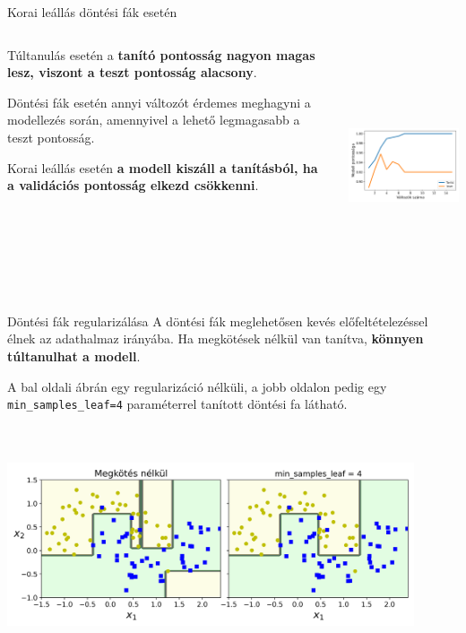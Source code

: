 \documentclass[english, aspectratio=169]{beamer}
\begin{document}
\begin{frame}{Korai leállás döntési fák esetén}
\begin{columns}
\begin{column}{.5\textwidth}
Túltanulás esetén a \textbf{tanító pontosság nagyon magas lesz, viszont a teszt pontosság alacsony}.\par\smallskip
Döntési fák esetén annyi változót érdemes meghagyni a modellezés során, amennyivel a lehető legmagasabb a teszt pontosság.\par\smallskip
Korai leállás esetén \textbf{a modell kiszáll a tanításból, ha a validációs pontosság elkezd csökkenni}. 
\end{column}
\begin{column}{.5\textwidth}
\begin{center}
\includegraphics[width=7cm, height=7cm, keepaspectratio]{images/decision_trees_5.png}
\end{center}
\end{column}
\end{columns}
\end{frame}

\begin{frame}{Döntési fák regularizálása}
A döntési fák meglehetősen kevés előfeltételezéssel élnek az adathalmaz irányába. Ha megkötések nélkül van tanítva, \textbf{könnyen túltanulhat a modell}.\par\medskip
A bal oldali ábrán egy regularizáció nélküli, a jobb oldalon pedig egy \texttt{min\_samples\_leaf=4} paraméterrel tanított döntési fa látható. 
\begin{center}
\includegraphics[width=12cm, height=7cm, keepaspectratio]{images/decision_trees_4.png}
\end{center}
\end{frame}
\end{document}
